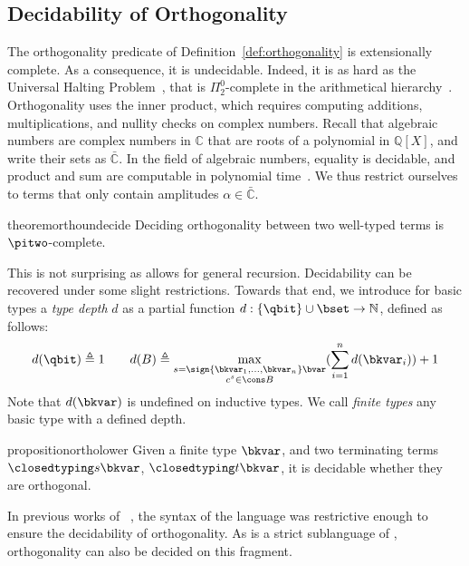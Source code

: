 \subsection{Decidability of Orthogonality}
\label{subsec:orthogonality}
The orthogonality predicate of Definition~\ref{def:orthogonality} is
extensionally complete. As a consequence, it is undecidable.
Indeed, it is as hard as the Universal Halting Problem~\cite{EGZ09}, that is
$\Pi^0_2$-complete in the arithmetical hierarchy~\cite{Nie09}.
Orthogonality uses the inner product, which requires computing
additions, multiplications, and nullity checks on complex numbers. Recall that
algebraic numbers are complex numbers in $\mathbb C$ that are roots of a
polynomial in $\mathbb Q[X]$, and write their sets as $\bar{\mathbb C}$. In the
field of algebraic numbers, equality is decidable, and product and sum are
computable in polynomial time~\cite{HHK05}. We thus restrict ourselves to terms
that only contain amplitudes $\alpha \in \bar{\mathbb C}$.

\begin{restatable}{theorem}{orthoundecide}
  \label{thm:orthogonality-undecidable}
  Deciding orthogonality between two well-typed terms is $\pitwo$-complete.
\end{restatable}

This is not surprising as \hyrql{} allows for
general recursion. Decidability can be recovered under some slight restrictions.
Towards that end, we introduce for basic types
a \emph{type depth} $d$ as a partial function $d: \{\qbit \}\cup\bset \to
\mathbb N $, defined as follows:
\[
  d(\qbit) \triangleq 1 \qquad
  d(B) \triangleq \max_{\substack{{ s = \sign{\bkvar_1, \dots, \bkvar_n}
  \bvar} \\ c^s \in \cons B}}
  (\sum_{i=1}^n d(\bkvar_i)) + 1
\]
Note that $d(\bkvar)$ is undefined on inductive types.
We call \emph{finite types} any basic type with a defined depth.

\begin{restatable}{proposition}{ortholower}
  \label{prop:orthogonality-lower}
  Given a finite type $\bkvar$, and two terminating terms $\closedtyping s
  \bkvar$, $\closedtyping t \bkvar$, it is decidable whether they are
  orthogonal.
\end{restatable}

In previous works of \spm~\cite{CSV23, CLV24},
the syntax of the language was restrictive enough to ensure the decidability of
orthogonality. As \spm{} is a strict sublanguage of {\hyrql}, orthogonality
can also be decided on this fragment.

